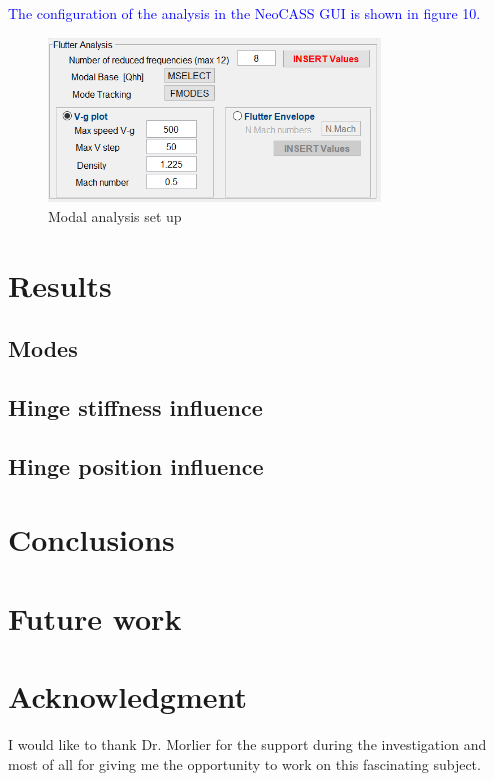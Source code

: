 \documentclass[conference]{IEEEtran}
\newlength\figureheight
\newlength\figurewidth
\begin{document}
\textcolor{blue}{The configuration of the analysis in the NeoCASS GUI is shown in figure 10.}

\begin{figure}[htp]
  \centering
  \setlength\figureheight{5cm}
  \setlength\figurewidth{6cm}
  \includegraphics[width=250pt]{images/FlutterGUI.png}
  \caption{Modal analysis set up}
  \label{fig:my-figure}
\end{figure}


\section{Results}

\subsection{Modes}  
\subsection{Hinge stiffness influence}
\subsection{Hinge position influence}



\section{Conclusions}



\section{Future work}



\section*{Acknowledgment}
I would like to thank Dr. Morlier for the support during the investigation and most of all for giving me the opportunity to work on this fascinating subject.



\end{document}
